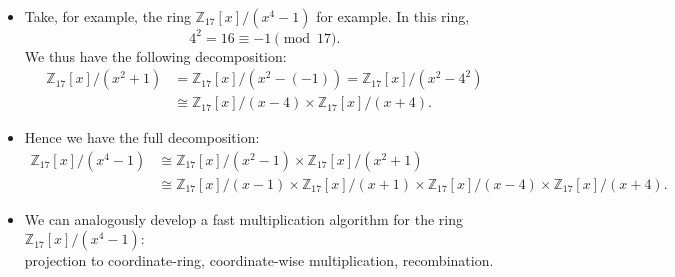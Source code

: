 \begin{frame}
    \begin{itemize}

        \item Take, for example, the ring \( \mathbb{Z}_{17}[x]/(x^{4}-1)\) for example. 
            In this ring,
            \[
                4^{2} = 16 \equiv -1 \pmod{17}.
            \]
            We thus have the following decomposition:
            \begin{align*}
                \mathbb{Z}_{17}[x]/(x^{2}+1) 
                &= \mathbb{Z}_{17}[x] / (x^{2} - (-1))
                = \mathbb{Z}_{17}[x] / (x^{2} - 4^{2})\\
                &\cong 
                \mathbb{Z}_{17}[x]/(x-4) \times 
                \mathbb{Z}_{17}[x]/(x+4).
            \end{align*}

        \item Hence we have the full decomposition:
            \begin{align*}
                \mathbb{Z}_{17}[x]/(x^{4}-1) 
                &\cong 
                \mathbb{Z}_{17}[x]/(x^{2}-1) \times 
                \mathbb{Z}_{17}[x]/(x^{2}+1)\\
                &\cong 
                \mathbb{Z}_{17}[x]/(x-1) \times 
                \mathbb{Z}_{17}[x]/(x+1) \times 
                \mathbb{Z}_{17}[x]/(x-4) \times 
                \mathbb{Z}_{17}[x]/(x+4).
            \end{align*}

        \item We can analogously develop a fast multiplication algorithm for the ring 
            \( \mathbb{Z}_{17}[x]/(x^{4}-1) \):\\
            projection to coordinate-ring, coordinate-wise multiplication, recombination.
    \end{itemize}
\end{frame}

